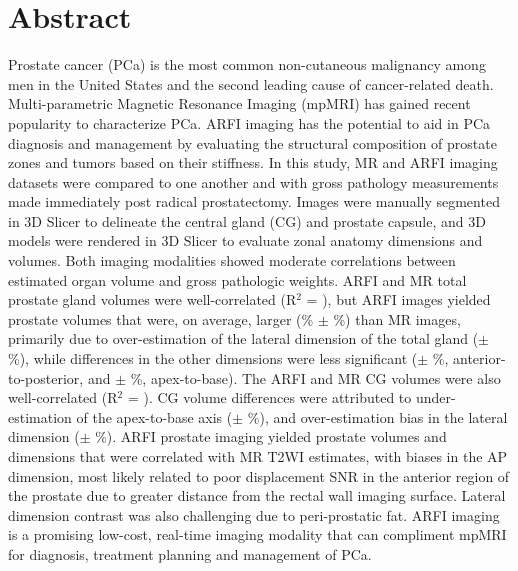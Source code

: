 \section*{Abstract}
Prostate cancer (PCa) is the most common non-cutaneous malignancy among men in
the United States and the second leading cause of cancer-related death.
Multi-parametric Magnetic Resonance Imaging (mpMRI) has gained recent
popularity to characterize PCa.  ARFI imaging has the potential to aid in PCa
diagnosis and management by evaluating the structural composition of prostate
zones and tumors based on their stiffness.  In this study, \invivo MR and ARFI
imaging datasets were compared to one another and with gross pathology
measurements made immediately post radical prostatectomy.  Images were manually
segmented in 3D Slicer to delineate the central gland (CG) and prostate
capsule, and 3D models were rendered in 3D Slicer to evaluate zonal anatomy
dimensions and volumes.  Both imaging modalities showed moderate correlations
between estimated organ volume and gross pathologic weights.  ARFI and MR total
prostate gland volumes were well-correlated (R$^2$ = \MRarfiVolTotalRsq), but
ARFI images yielded prostate volumes that were, on average, larger
(\MRarfiVolTotalMeanDiff\% $\pm$ \MRarfiVolTotalStdDiff\%) than MR images,
primarily due to over-estimation of the lateral dimension of the total gland
(\ARFImrTotalLatLatMeanPct $\pm$ \ARFImrTotalLatLatStdPct\%), while differences
in the other dimensions were less significant (\ARFImrTotalAntPostMeanPct $\pm$
\ARFImrTotalAntPostStdPct\%, anterior-to-posterior, and
\ARFImrTotalApexBaseMeanPct $\pm$ \ARFImrTotalApexBaseStdPct\%, apex-to-base).
The ARFI and MR CG volumes were also well-correlated (R$^2$ =
\MRarfiVolCentralRsq).  CG volume differences were attributed to
under-estimation of the apex-to-base axis (\ARFImrCentralApexBaseMeanPct $\pm$
\ARFImrCentralApexBaseStdPct\%), and over-estimation bias in the lateral
dimension (\ARFImrCentralLatLatMeanPct $\pm$ \ARFImrCentralLatLatStdPct\%).
ARFI prostate imaging yielded prostate volumes and dimensions that were
correlated with MR T2WI estimates, with biases in the AP dimension, most likely
related to poor displacement SNR in the anterior region of the prostate due to
greater distance from the rectal wall imaging surface.  Lateral dimension
contrast was also challenging due to peri-prostatic fat.  ARFI imaging is a
promising low-cost, real-time imaging modality that can compliment mpMRI for
diagnosis, treatment planning and management of PCa.
